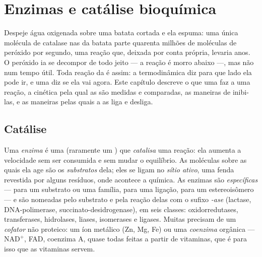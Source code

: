 \chapter{Enzimas e catálise bioquímica}\label{ch:b1:enzymes}

Despeje água oxigenada sobre uma batata cortada e ela espuma: uma única
molécula de catalase nas  da batata parte quarenta milhões de
moléculas de peróxido por segundo, uma reação que, deixada por conta
própria, levaria anos. O peróxido ia se decompor de todo jeito --- a
reação é morro abaixo ---, mas não num tempo útil. Toda reação da 
é assim: a termodinâmica diz para que lado ela pode ir, e uma
\emph{} diz se ela vai agora. Este capítulo descreve o que uma
 faz a uma reação, a cinética pela qual as  são medidas e
comparadas, as maneiras de inibi-las, e as maneiras pelas quais a 
as liga e desliga.

\section{Catálise}

\begin{definition}\label{def:b1:enzymes:enzyme}
Uma \emph{enzima} é uma  (raramente um ) que
\emph{catalisa} uma reação: ela aumenta a velocidade sem ser consumida e
sem mudar o equilíbrio. As moléculas sobre as quais ela age são os
\emph{substratos} dela; eles se ligam no
\emph{sítio ativo}, uma fenda revestida por alguns
resíduos, onde acontece a química. As enzimas são \emph{específicas} ---
para um substrato ou uma família, para uma ligação, para um
estereoisômero --- e são nomeadas pelo substrato e pela reação delas com
o sufixo \emph{-ase} (lactase, DNA-polimerase,
succinato-desidrogenase), em seis classes: oxidorredutases,
transferases, hidrolases, liases, isomerases e ligases. Muitas precisam
de um \emph{cofator} não proteico: um íon metálico (Zn,
Mg, Fe) ou uma \emph{coenzima} orgânica ---
$\mathrm{NAD^+}$, FAD, coenzima A, quase todas feitas a partir de
vitaminas, que é para isso que as vitaminas servem.
\end{definition}

